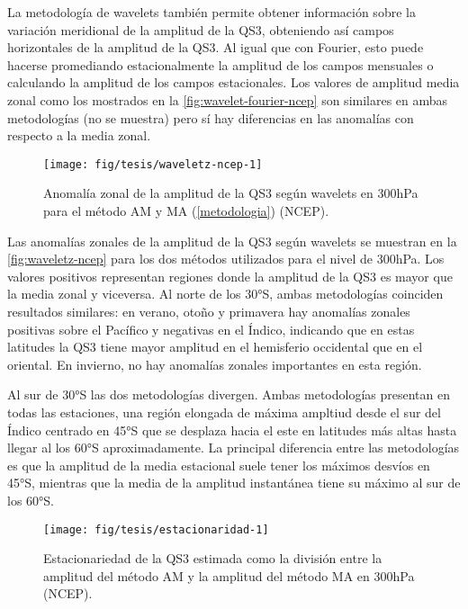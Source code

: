 \documentclass[spanish,a4paper,12p]{book}
\begin{document}
La metodología de wavelets también permite obtener información sobre la
variación meridional de la amplitud de la QS3, obteniendo así campos
horizontales de la amplitud de la QS3. Al igual que con Fourier, esto
puede hacerse promediando estacionalmente la amplitud de los campos
mensuales o calculando la amplitud de los campos estacionales. Los
valores de amplitud media zonal como los mostrados en la
\autoref{fig:wavelet-fourier-ncep} son similares en ambas metodologías
(no se muestra) pero sí hay diferencias en las anomalías con respecto a
la media zonal.

\begin{figure}

{\centering \texttt{[image: fig/tesis/waveletz-ncep-1]} 

}

\caption{Anomalía zonal de la amplitud de la QS3 según wavelets en 300hPa para el método AM y MA (\autoref{metodologia}) (NCEP).}\label{fig:waveletz-ncep}
\end{figure}

Las anomalías zonales de la amplitud de la QS3 según wavelets se
muestran en la \autoref{fig:waveletz-ncep} para los dos métodos
utilizados para el nivel de 300hPa. Los valores positivos representan
regiones donde la amplitud de la QS3 es mayor que la media zonal y
viceversa. Al norte de los 30°S, ambas metodologías coinciden resultados
similares: en verano, otoño y primavera hay anomalías zonales positivas
sobre el Pacífico y negativas en el Índico, indicando que en estas
latitudes la QS3 tiene mayor amplitud en el hemisferio occidental que en
el oriental. En invierno, no hay anomalías zonales importantes en esta
región.

Al sur de 30°S las dos metodologías divergen. Ambas metodologías
presentan en todas las estaciones, una región elongada de máxima
ampltiud desde el sur del Índico centrado en 45°S que se desplaza hacia
el este en latitudes más altas hasta llegar al los 60°S aproximadamente.
La principal diferencia entre las metodologías es que la amplitud de la
media estacional suele tener los máximos desvíos en 45°S, mientras que
la media de la amplitud instantánea tiene su máximo al sur de los 60°S.

\begin{figure*}
\texttt{[image: fig/tesis/estacionaridad-1]} \caption{Estacionariedad de la QS3 estimada como la división entre la amplitud del método AM y la amplitud del método MA en 300hPa (NCEP).}\label{fig:estacionaridad}
\end{figure*}
\end{document}
